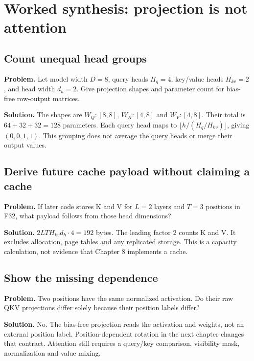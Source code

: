 \clearpage
\section{Worked synthesis: projection is not attention}
\subsection{Count unequal head groups}
\textbf{Problem.} Let model width $D=8$, query heads $H_q=4$, key/value heads
$H_{kv}=2$, and head width $d_h=2$. Give projection shapes and parameter count
for bias-free row-output matrices.

\textbf{Solution.} The shapes are $W_Q:[8,8]$, $W_K:[4,8]$ and $W_V:[4,8]$.
Their total is $64+32+32=128$ parameters. Each query head maps to
$\lfloor h/(H_q/H_{kv})\rfloor$, giving $(0,0,1,1)$.
This grouping does not average the query heads or merge their output values.

\subsection{Derive future cache payload without claiming a cache}
\textbf{Problem.} If later code stores K and V for $L=2$ layers and $T=3$
positions in F32, what payload follows from those head dimensions?

\textbf{Solution.} $2LTH_{kv}d_h\cdot4=192$ bytes. The leading factor 2 counts
K and V. It excludes allocation, page tables and any replicated storage.
This is a capacity calculation, not evidence that Chapter 8 implements a cache.

\subsection{Show the missing dependence}
\textbf{Problem.} Two positions have the same normalized activation. Do their
raw QKV projections differ solely because their position labels differ?

\textbf{Solution.} No. The bias-free projection reads the activation and
weights, not an external position label. Position-dependent rotation in the
next chapter changes that contract. Attention still requires a query/key
comparison, visibility mask, normalization and value mixing.
